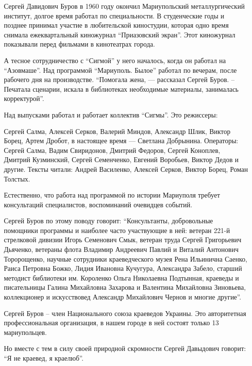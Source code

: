 Сергей Давидович Буров в 1960 году окончил Мариупольский металлургический
институт, долгое время работал по специальности. В студенческие годы и позднее
принимал участие в любительской киностудии, которая одно время снимала
ежеквартальный киножурнал \enquote{Приазовский экран}. Этот киножурнал
показывали перед фильмами в кинотеатрах города.

А тесное сотрудничество с \enquote{Сигмой} у него началось, когда он работал на
\enquote{Азовмаше}. Над программой \enquote{Мариуполь. Былое} работал по вечерам, после
рабочего дня на производстве. \enquote{Помогала жена, — рассказал Сергей Буров. –
Печатала сценарии, искала в библиотеках необходимые материалы, занималась
корректурой}.

Над выпусками работал и работает коллектив \enquote{Сигмы}. Это режиссеры:

Сергей Салма, Алексей Серков, Валерий Миндов, Александр Шлик, Виктор Борец,
Артем Дробот, в настоящее время — Светлана Добрынина. Операторы: Сергей Салма,
Вадим Свиридонов, Дмитрий Федоров, Сергей Коноплев, Дмитрий Кузминский, Сергей
Семенченко, Евгений Воробьев, Виктор Дедов и другие. Тексты читали: Андрей
Василенко, Алексей Серков, Виктор Борец, Роман Толстых.

Естественно, что работа над программой по истории Мариуполя требует
консультаций специалистов, воспоминаний очевидцев событий.

Сергей Буров по этому поводу говорит: \enquote{Консультанты, добровольные помощники
программы и наиболее часто участвующие в ней: ветеран 221-й стрелковой дивизии
Игорь Семенович Смык, ветеран труда Сергей Григорьевич Дьяченко, ветераны флота
Владимир Андреевич Павлий и Виталий Антонович Торорощенко, научные сотрудники
краеведческого музея Рена Ильинична Саенко, Раиса Петровна Божко, Лидия
Ивановна Кучугура, Александра Забело, старший методист библиотеки им. Короленко
Ольга Николаевна Подтынная, краеведы и писательницы Галина Михайловна Захарова
и Валентина Михайловна Зиновьева, коллекционер и искусствовед Александр
Михайлович Чернов и многие другие}.

Сергей Буров – член Национального союза краеведов Украины. Это авторитетная
профессиональная организация, в нашем городе в ней состоят только 13
мариупольцев.

Но вместе с тем в силу своей природной скромности Сергей Давыдович говорит:
\enquote{Я не краевед, я краелюб}.

